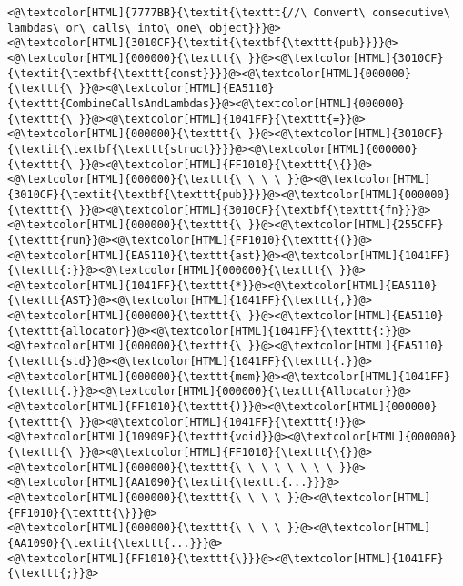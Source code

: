 \begin{lstlisting}
<@\textcolor[HTML]{7777BB}{\textit{\texttt{//\ Convert\ consecutive\ lambdas\ or\ calls\ into\ one\ object}}}@>
<@\textcolor[HTML]{3010CF}{\textit{\textbf{\texttt{pub}}}}@><@\textcolor[HTML]{000000}{\texttt{\ }}@><@\textcolor[HTML]{3010CF}{\textit{\textbf{\texttt{const}}}}@><@\textcolor[HTML]{000000}{\texttt{\ }}@><@\textcolor[HTML]{EA5110}{\texttt{CombineCallsAndLambdas}}@><@\textcolor[HTML]{000000}{\texttt{\ }}@><@\textcolor[HTML]{1041FF}{\texttt{=}}@><@\textcolor[HTML]{000000}{\texttt{\ }}@><@\textcolor[HTML]{3010CF}{\textit{\textbf{\texttt{struct}}}}@><@\textcolor[HTML]{000000}{\texttt{\ }}@><@\textcolor[HTML]{FF1010}{\texttt{\{}}@>
<@\textcolor[HTML]{000000}{\texttt{\ \ \ \ }}@><@\textcolor[HTML]{3010CF}{\textit{\textbf{\texttt{pub}}}}@><@\textcolor[HTML]{000000}{\texttt{\ }}@><@\textcolor[HTML]{3010CF}{\textbf{\texttt{fn}}}@><@\textcolor[HTML]{000000}{\texttt{\ }}@><@\textcolor[HTML]{255CFF}{\texttt{run}}@><@\textcolor[HTML]{FF1010}{\texttt{(}}@><@\textcolor[HTML]{EA5110}{\texttt{ast}}@><@\textcolor[HTML]{1041FF}{\texttt{:}}@><@\textcolor[HTML]{000000}{\texttt{\ }}@><@\textcolor[HTML]{1041FF}{\texttt{*}}@><@\textcolor[HTML]{EA5110}{\texttt{AST}}@><@\textcolor[HTML]{1041FF}{\texttt{,}}@><@\textcolor[HTML]{000000}{\texttt{\ }}@><@\textcolor[HTML]{EA5110}{\texttt{allocator}}@><@\textcolor[HTML]{1041FF}{\texttt{:}}@><@\textcolor[HTML]{000000}{\texttt{\ }}@><@\textcolor[HTML]{EA5110}{\texttt{std}}@><@\textcolor[HTML]{1041FF}{\texttt{.}}@><@\textcolor[HTML]{000000}{\texttt{mem}}@><@\textcolor[HTML]{1041FF}{\texttt{.}}@><@\textcolor[HTML]{000000}{\texttt{Allocator}}@><@\textcolor[HTML]{FF1010}{\texttt{)}}@><@\textcolor[HTML]{000000}{\texttt{\ }}@><@\textcolor[HTML]{1041FF}{\texttt{!}}@><@\textcolor[HTML]{10909F}{\texttt{void}}@><@\textcolor[HTML]{000000}{\texttt{\ }}@><@\textcolor[HTML]{FF1010}{\texttt{\{}}@>
<@\textcolor[HTML]{000000}{\texttt{\ \ \ \ \ \ \ \ }}@><@\textcolor[HTML]{AA1090}{\textit{\texttt{...}}}@>
<@\textcolor[HTML]{000000}{\texttt{\ \ \ \ }}@><@\textcolor[HTML]{FF1010}{\texttt{\}}}@>
<@\textcolor[HTML]{000000}{\texttt{\ \ \ \ }}@><@\textcolor[HTML]{AA1090}{\textit{\texttt{...}}}@>
<@\textcolor[HTML]{FF1010}{\texttt{\}}}@><@\textcolor[HTML]{1041FF}{\texttt{;}}@>


\end{lstlisting}
